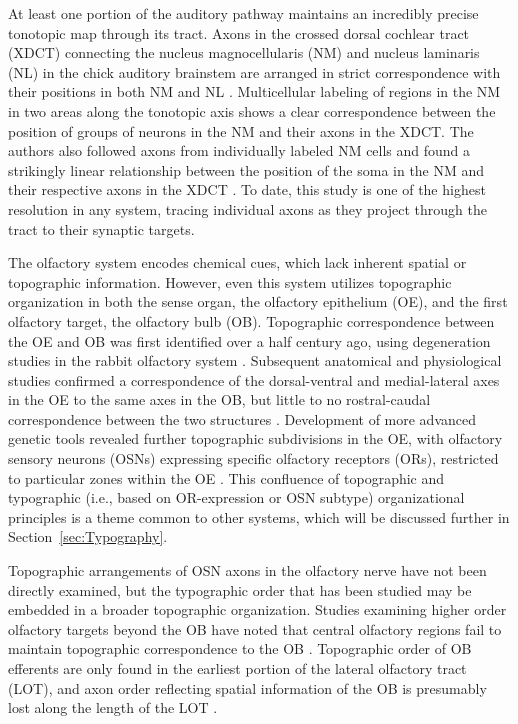 At least one portion of the auditory pathway maintains an incredibly precise tonotopic map through its tract. 
Axons in the crossed dorsal cochlear tract (XDCT) connecting the nucleus magnocellularis (NM) and nucleus laminaris (NL) in the chick auditory brainstem are arranged in strict correspondence with their positions in both NM and NL \cite{kashima2013pre}. 
Multicellular labeling of regions in the NM in two areas along the tonotopic axis shows a clear correspondence between the position of groups of neurons in the NM and their axons in the XDCT. 
The authors also followed axons from individually labeled NM cells and found a strikingly linear relationship between the position of the soma in the NM and their respective axons in the XDCT \cite{kashima2013pre}. 
To date, this study is one of the highest resolution in any system, tracing individual axons as they project through the tract to their synaptic targets. 

The olfactory system encodes chemical cues, which lack inherent spatial or topographic information.
However, even this system utilizes topographic organization in both the sense organ, the olfactory epithelium (OE), and the first olfactory target, the olfactory bulb (OB).
Topographic correspondence between the OE and OB was first identified over a half century ago, using degeneration studies in the rabbit olfactory system \cite{clark1951projection}.
Subsequent anatomical and physiological studies confirmed a correspondence of the dorsal-ventral and medial-lateral axes in the OE to the same axes in the OB, but little to no rostral-caudal correspondence between the two structures \cite{land1973localized,costanzo1978spatially,saucier1986analysis}.
Development of more advanced genetic tools revealed further topographic subdivisions in the OE, with olfactory sensory neurons (OSNs) expressing specific olfactory receptors (ORs), restricted to particular zones within the OE \cite{ressler1993zonal,vassar1993spatial}.
This confluence of topographic and typographic (i.e., based on OR-expression or OSN subtype) organizational principles is a theme common to other systems, which will be discussed further in Section~\ref{sec:Typography}.

Topographic arrangements of OSN axons in the olfactory nerve have not been directly examined, but the typographic order that has been studied may be embedded in a broader topographic organization.
Studies examining higher order olfactory targets beyond the OB have noted that central olfactory regions fail to maintain topographic correspondence to the OB \cite{luskin1982distribution,sosulski2011distinct}.
Topographic order of OB efferents are only found in the earliest portion of the lateral olfactory tract (LOT), and axon order reflecting spatial information of the OB is presumably lost along the length of the LOT \cite{price1975observation}.

